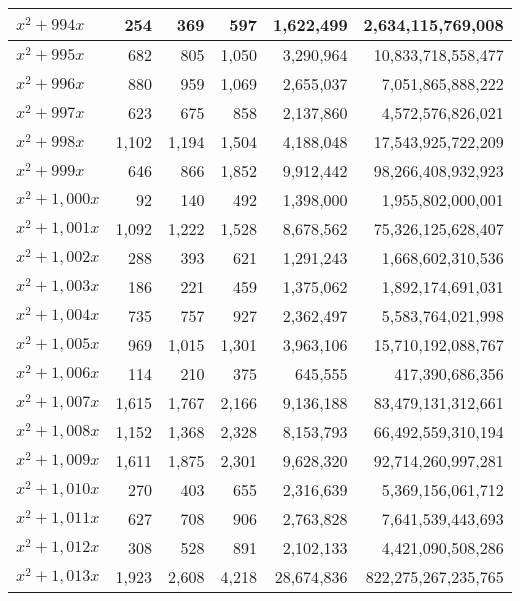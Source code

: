 \documentclass[a4paper]{amsproc}
\theoremstyle{plain}
\begin{document}
\begin{longtable}{ | l | r | r | r | r | r | }
$x^2 + 994x$ & 254 & 369 & 597 & 1{,}622{,}499 & 2{,}634{,}115{,}769{,}008 \\ \hline
$x^2 + 995x$ & 682 & 805 & 1{,}050 & 3{,}290{,}964 & 10{,}833{,}718{,}558{,}477 \\ \hline
$x^2 + 996x$ & 880 & 959 & 1{,}069 & 2{,}655{,}037 & 7{,}051{,}865{,}888{,}222 \\ \hline
$x^2 + 997x$ & 623 & 675 & 858 & 2{,}137{,}860 & 4{,}572{,}576{,}826{,}021 \\ \hline
$x^2 + 998x$ & 1{,}102 & 1{,}194 & 1{,}504 & 4{,}188{,}048 & 17{,}543{,}925{,}722{,}209 \\ \hline
$x^2 + 999x$ & 646 & 866 & 1{,}852 & 9{,}912{,}442 & 98{,}266{,}408{,}932{,}923 \\ \hline
$x^2 + 1{,}000x$ & 92 & 140 & 492 & 1{,}398{,}000 & 1{,}955{,}802{,}000{,}001 \\ \hline
$x^2 + 1{,}001x$ & 1{,}092 & 1{,}222 & 1{,}528 & 8{,}678{,}562 & 75{,}326{,}125{,}628{,}407 \\ \hline
$x^2 + 1{,}002x$ & 288 & 393 & 621 & 1{,}291{,}243 & 1{,}668{,}602{,}310{,}536 \\ \hline
$x^2 + 1{,}003x$ & 186 & 221 & 459 & 1{,}375{,}062 & 1{,}892{,}174{,}691{,}031 \\ \hline
$x^2 + 1{,}004x$ & 735 & 757 & 927 & 2{,}362{,}497 & 5{,}583{,}764{,}021{,}998 \\ \hline
$x^2 + 1{,}005x$ & 969 & 1{,}015 & 1{,}301 & 3{,}963{,}106 & 15{,}710{,}192{,}088{,}767 \\ \hline
$x^2 + 1{,}006x$ & 114 & 210 & 375 & 645{,}555 & 417{,}390{,}686{,}356 \\ \hline
$x^2 + 1{,}007x$ & 1{,}615 & 1{,}767 & 2{,}166 & 9{,}136{,}188 & 83{,}479{,}131{,}312{,}661 \\ \hline
$x^2 + 1{,}008x$ & 1{,}152 & 1{,}368 & 2{,}328 & 8{,}153{,}793 & 66{,}492{,}559{,}310{,}194 \\ \hline
$x^2 + 1{,}009x$ & 1{,}611 & 1{,}875 & 2{,}301 & 9{,}628{,}320 & 92{,}714{,}260{,}997{,}281 \\ \hline
$x^2 + 1{,}010x$ & 270 & 403 & 655 & 2{,}316{,}639 & 5{,}369{,}156{,}061{,}712 \\ \hline
$x^2 + 1{,}011x$ & 627 & 708 & 906 & 2{,}763{,}828 & 7{,}641{,}539{,}443{,}693 \\ \hline
$x^2 + 1{,}012x$ & 308 & 528 & 891 & 2{,}102{,}133 & 4{,}421{,}090{,}508{,}286 \\ \hline
$x^2 + 1{,}013x$ & 1{,}923 & 2{,}608 & 4{,}218 & 28{,}674{,}836 & 822{,}275{,}267{,}235{,}765 \\ \hline

\end{longtable}
\end{document}

